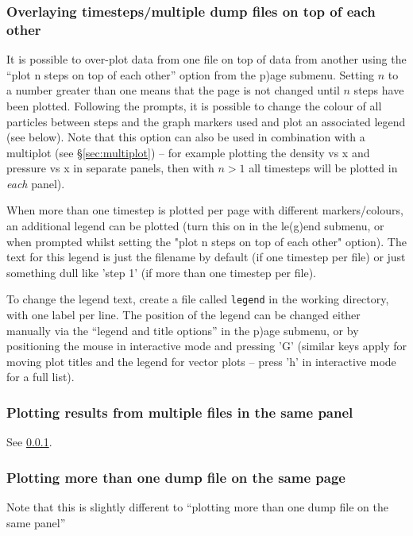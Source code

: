 \documentclass[a4paper,10pt]{article}
\begin{document}
\subsubsection{ Overlaying timesteps/multiple dump files on top of each other}
\label{sec:nstepsontopofeachother}
 It is possible to over-plot data from one file on top of data from another using the ``plot n steps on top of each other'' option from the p)age submenu. Setting $n$ to a number greater than one means that the page is not changed until $n$ steps have been plotted. Following the prompts, it is possible to change the colour of all particles between steps and the graph markers used and plot an associated legend (see below). Note that this option can also be used in combination with a multiplot (see \S\ref{sec:multiplot}) -- for example plotting the density vs x and pressure vs x in separate panels, then with $n > 1$ all timesteps will be plotted in \emph{each} panel). 

When more than one timestep is plotted per page with different markers/colours, an additional legend can be
plotted (turn this on in the le(g)end submenu, or when prompted whilst setting the "plot n steps on top of each other" option). The text for this legend is just the filename by default (if one timestep per file) or just something dull like 'step 1' (if more than one timestep per file). 

To change the legend text, create a file called \verb+legend+ in the working directory, with one label per line. The position of the legend can be changed either manually via the ``legend and title options'' in the p)age submenu, or by positioning the mouse in interactive mode and pressing 'G' (similar keys apply for moving plot titles and the legend for vector plots -- press 'h' in interactive mode for a full list). 

\subsubsection{ Plotting results from multiple files in the same panel}
 See \ref{sec:nstepsontopofeachother}.

\subsubsection{ Plotting more than one dump file on the same page}
 Note that this is slightly different to ``plotting more than one dump file on the same panel''
\end{document}
